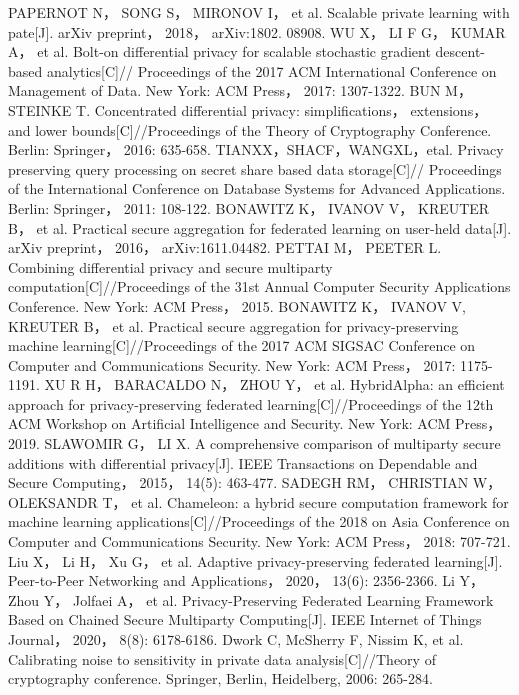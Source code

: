 \documentclass[12pt,openany,a4paper,fancyhdr,oneside]{ctexbook}
\begin{document}
\begin{thebibliography}{99}
 PAPERNOT N， SONG S， MIRONOV I， et al. Scalable private learning with pate[J]. arXiv preprint， 2018， arXiv:1802. 08908.
WU X， LI F G， KUMAR A， et al. Bolt-on differential privacy for scalable stochastic gradient descent-based analytics[C]// Proceedings of the 2017 ACM International Conference on Management of Data. New York: ACM Press， 2017: 1307-1322.
BUN M， STEINKE T. Concentrated differential privacy: simplifications， extensions， and lower bounds[C]//Proceedings of the Theory of Cryptography Conference. Berlin: Springer， 2016: 635-658.
TIANXX，SHACF，WANGXL，etal. Privacy preserving query processing on secret share based data storage[C]// Proceedings of the International Conference on Database Systems for Advanced Applications. Berlin: Springer， 2011: 108-122.
BONAWITZ K， IVANOV V， KREUTER B， et al. Practical secure aggregation for federated learning on user-held data[J]. arXiv preprint， 2016， arXiv:1611.04482.
PETTAI M， PEETER L. Combining differential privacy and secure multiparty computation[C]//Proceedings of the 31st Annual Computer Security Applications Conference. New York: ACM Press， 2015.
BONAWITZ K， IVANOV V, KREUTER B， et al. Practical secure aggregation for privacy-preserving machine learning[C]//Proceedings of the 2017 ACM SIGSAC Conference on Computer and Communications Security. New York: ACM Press， 2017: 1175-1191.
XU R H， BARACALDO N， ZHOU Y， et al. HybridAlpha: an efficient approach for privacy-preserving federated learning[C]//Proceedings of the 12th ACM Workshop on Artificial Intelligence and Security. New York: ACM Press， 2019.
SLAWOMIR G， LI X. A comprehensive comparison of multiparty secure additions with differential privacy[J]. IEEE Transactions on Dependable and Secure Computing， 2015， 14(5): 463-477.
SADEGH RM， CHRISTIAN W， OLEKSANDR T， et al. Chameleon: a hybrid secure computation framework for machine learning applications[C]//Proceedings of the 2018 on Asia Conference on Computer and Communications Security. New York: ACM Press， 2018: 707-721.
Liu X， Li H， Xu G， et al. Adaptive privacy-preserving federated learning[J]. Peer-to-Peer Networking and Applications， 2020， 13(6): 2356-2366.
Li Y， Zhou Y， Jolfaei A， et al. Privacy-Preserving Federated Learning Framework Based on Chained Secure Multiparty Computing[J]. IEEE Internet of Things Journal， 2020， 8(8): 6178-6186.
Dwork C, McSherry F, Nissim K, et al. Calibrating noise to sensitivity in private data analysis[C]//Theory of cryptography conference. Springer, Berlin, Heidelberg, 2006: 265-284.


\end{thebibliography}


\pagestyle{plain}
\clearpage
{}
{}


\pagestyle{plain}
\clearpage
{}
{}



\printindex
\end{document}
